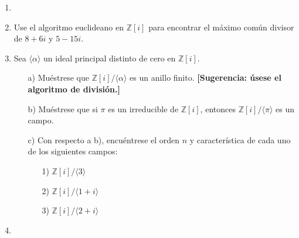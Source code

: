 \documentclass[12pt]{article}
\theoremstyle{definition}
\theoremstyle{remark}
\begin{document}
\begin{enumerate}
    \item  
    
    \item Use el algoritmo euclideano en $\mathbb{Z}[i]$ para encontrar el máximo común divisor de $8 + 6i$ y $5 - 15i$.

    \item Sea $\langle \alpha \rangle$ un ideal principal distinto de cero en $\mathbb{Z}[i]$.
    
    \begin{enumerate}
        \item[a)] Muéstrese que $\mathbb{Z}[i]/\langle \alpha \rangle$ es un anillo finito. \textbf{[Sugerencia: úsese el algoritmo de división.]}
        
        \item[b)] Muéstrese que si $\pi$ es un irreducible de $\mathbb{Z}[i]$, entonces $\mathbb{Z}[i]/\langle \pi \rangle$ es un campo.
        
        \item[c)] Con respecto a b), encuéntrese el orden $n$ y característica de cada uno de los siguientes campos:
        
        \begin{enumerate}
            \item[1)] $\mathbb{Z}[i]/\langle 3 \rangle$
            \item[2)] $\mathbb{Z}[i]/\langle 1 + i \rangle$
            \item[3)] $\mathbb{Z}[i]/\langle 2 + i \rangle$
        \end{enumerate}
    \end{enumerate}

    \item 
\end{enumerate}

\end{document}
